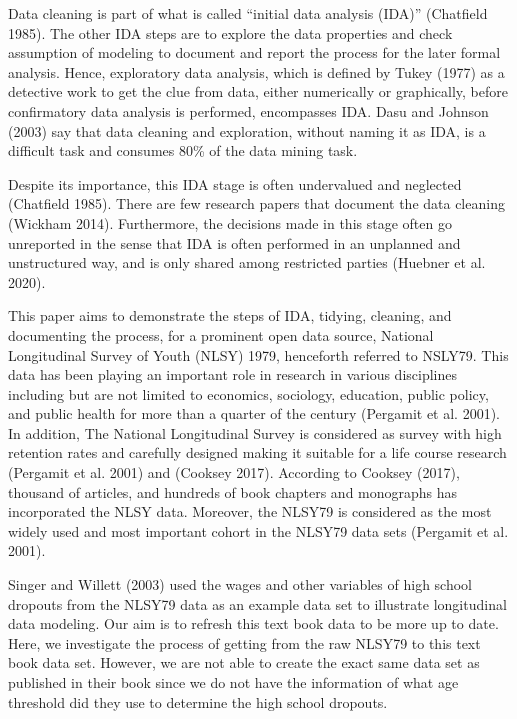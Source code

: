 \documentclass{article}
\begin{document}
Data cleaning is part of what is called ``initial data analysis (IDA)'' (Chatfield 1985). The other IDA steps are to explore the data properties and check assumption of modeling to document and report the process for the later formal analysis. Hence, exploratory data analysis, which is defined by Tukey (1977) as a detective work to get the clue from data, either numerically or graphically, before confirmatory data analysis is performed, encompasses IDA. Dasu and Johnson (2003) say that data cleaning and exploration, without naming it as IDA, is a difficult task and consumes 80\% of the data mining task.

Despite its importance, this IDA stage is often undervalued and neglected (Chatfield 1985). There are few research papers that document the data cleaning (Wickham 2014). Furthermore, the decisions made in this stage often go unreported in the sense that IDA is often performed in an unplanned and unstructured way, and is only shared among restricted parties (Huebner et al. 2020).

This paper aims to demonstrate the steps of IDA, tidying, cleaning, and documenting the process, for a prominent open data source, National Longitudinal Survey of Youth (NLSY) 1979, henceforth referred to NSLY79. This data has been playing an important role in research in various disciplines including but are not limited to economics, sociology, education, public policy, and public health for more than a quarter of the century (Pergamit et al. 2001). In addition, The National Longitudinal Survey is considered as survey with high retention rates and carefully designed making it suitable for a life course research (Pergamit et al. 2001) and (Cooksey 2017). According to Cooksey (2017), thousand of articles, and hundreds of book chapters and monographs has incorporated the NLSY data. Moreover, the NLSY79 is considered as the most widely used and most important cohort in the NLSY79 data sets (Pergamit et al. 2001).

Singer and Willett (2003) used the wages and other variables of high school dropouts from the NLSY79 data as an example data set to illustrate longitudinal data modeling. Our aim is to refresh this text book data to be more up to date. Here, we investigate the process of getting from the raw NLSY79 to this text book data set. However, we are not able to create the exact same data set as published in their book since we do not have the information of what age threshold did they use to determine the high school dropouts.
\end{document}
